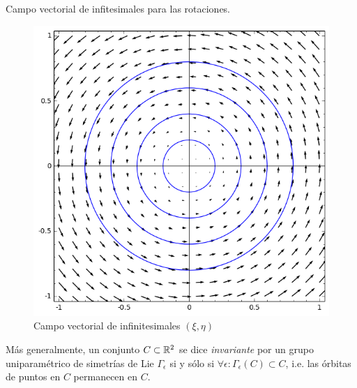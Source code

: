 \begin{ejemplo}
Campo vectorial de infitesimales para las rotaciones. 
\end{ejemplo}
\begin{figure}[h]
 \begin{center}
  \includegraphics[scale=.3]{imagenes/CampoVectorial.png}
 \end{center}
\caption{Campo vectorial de infinitesimales $(\xi,\eta)$ }
\end{figure}

\begin{definicion}
 Más generalmente, un conjunto $C\subset\mathbb{R}^2$ se dice \emph{invariante} por un grupo uniparamétrico de 
simetrías de Lie $\Gamma_{\epsilon}$ si y sólo si $\forall \epsilon: \Gamma_{\epsilon}(C)\subset C$, i.e. las órbitas de puntos en $C$ permanecen en $C$.
\end{definicion}

